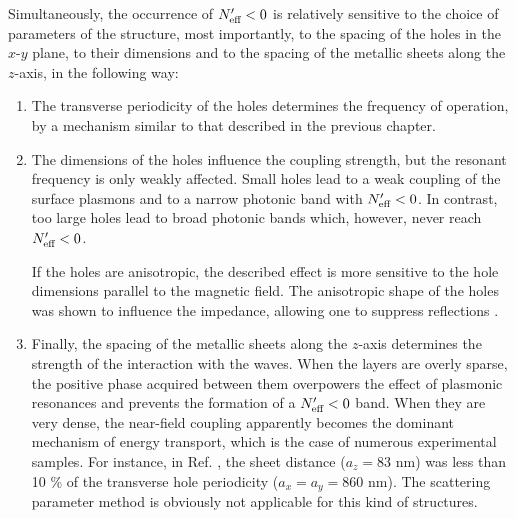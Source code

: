 Simultaneously,  the occurrence of $N_{\text{eff} }'<0$ is relatively sensitive to the choice of parameters of the structure, most importantly, to the spacing of the holes in the $x$-$y$ plane, to their dimensions and to the spacing of the metallic sheets along the $z$-axis, in the following way:
\begin{enumerate}
\item{The transverse periodicity of the holes determines the frequency of operation, by a mechanism similar to that described in the previous chapter.} 
\item{The dimensions of the holes influence the coupling strength, but the resonant frequency is only weakly affected. Small holes lead to a weak coupling of the surface plasmons and to a narrow photonic band with $N_{\text{eff} }'<0$. In contrast, too large holes lead to broad photonic bands which, however, never reach $N_{\text{eff} }'<0$. 
	
If the holes are anisotropic, the described effect is more sensitive to the hole dimensions parallel to the magnetic field. The anisotropic shape of the holes  was shown to influence the impedance, allowing one to suppress reflections \cite{croenne2009left}.} 
\item{Finally, the spacing of the metallic sheets along the $z$-axis determines the strength of the interaction with the waves. When the layers are overly sparse, the positive phase acquired between them overpowers the effect of plasmonic resonances and prevents the formation of a $N_{\text{eff} }'< 0$ band. When they are very dense, the near-field coupling apparently becomes the dominant mechanism of energy transport, which is the case of numerous experimental samples. For instance, in Ref. \cite{valentine2011development}, the sheet distance ($a_z = 83$ nm) was less than 10 \% of the transverse hole periodicity ($a_x = a_y = 860$ nm). The scattering parameter method is obviously not applicable for this kind of structures.}
\end{enumerate}


